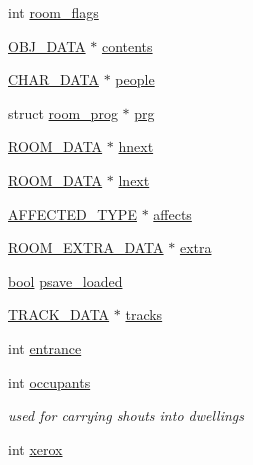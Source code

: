 \begin{DoxyCompactItemize}
\item 
int \hyperlink{structroom__data_a84dbca4dc31fa5c684a622ae44729024}{room\-\_\-flags}
\item 
\hyperlink{structs_8h_aaa59141dfc8c6ecdb6bfcf1537dd52d1}{O\-B\-J\-\_\-\-D\-A\-T\-A} $\ast$ \hyperlink{structroom__data_a21ae8b8d9887eccbd976893a6fe78a02}{contents}
\item 
\hyperlink{structs_8h_af33ed1e66e8541a08bed257124f50f31}{C\-H\-A\-R\-\_\-\-D\-A\-T\-A} $\ast$ \hyperlink{structroom__data_ab90c1c312b2fb520ba8ee1d12167d044}{people}
\item 
struct \hyperlink{structroom__prog}{room\-\_\-prog} $\ast$ \hyperlink{structroom__data_ab6e1a39fd56bee5e9330d88f8b3cee02}{prg}
\item 
\hyperlink{room_8h_aede519ef65d80b5242a4a28b69d5e097}{R\-O\-O\-M\-\_\-\-D\-A\-T\-A} $\ast$ \hyperlink{structroom__data_ae1d0742623d372dc510e1d1361059c17}{hnext}
\item 
\hyperlink{room_8h_aede519ef65d80b5242a4a28b69d5e097}{R\-O\-O\-M\-\_\-\-D\-A\-T\-A} $\ast$ \hyperlink{structroom__data_a09023636d7d6e20591e52aa7284499e8}{lnext}
\item 
\hyperlink{structs_8h_a0a9304fc5764d8448c93fdffdd64e1d2}{A\-F\-F\-E\-C\-T\-E\-D\-\_\-\-T\-Y\-P\-E} $\ast$ \hyperlink{structroom__data_a852672f3a86650ef3195e48ac8b98277}{affects}
\item 
\hyperlink{structs_8h_af3953d8fde89034d622ecf2501c554f9}{R\-O\-O\-M\-\_\-\-E\-X\-T\-R\-A\-\_\-\-D\-A\-T\-A} $\ast$ \hyperlink{structroom__data_aca16d6adb7775145a0fb1a155d7921dc}{extra}
\item 
\hyperlink{structs_8h_ad5c9d4ba3dc37783a528b0925dc981a0}{bool} \hyperlink{structroom__data_a3222bf61cd3cf881633df71fa78fffa7}{psave\-\_\-loaded}
\item 
\hyperlink{structs_8h_af9d52b956546cea804db50a106a26e61}{T\-R\-A\-C\-K\-\_\-\-D\-A\-T\-A} $\ast$ \hyperlink{structroom__data_a7712c20f923e067a93fa9c63ea79eb62}{tracks}
\item 
int \hyperlink{structroom__data_a1012bcc01b56574d4df5f88bb9392d3d}{entrance}
\item 
int \hyperlink{structroom__data_a2fe93bbee03c3867fdf6078fd11c5335}{occupants}
\begin{DoxyCompactList}\small\item\em used for carrying shouts into dwellings \end{DoxyCompactList}\item 
int \hyperlink{structroom__data_a7fadfb270bbed7f410206382e36cbec8}{xerox}
\item 

\end{DoxyCompactItemize}
